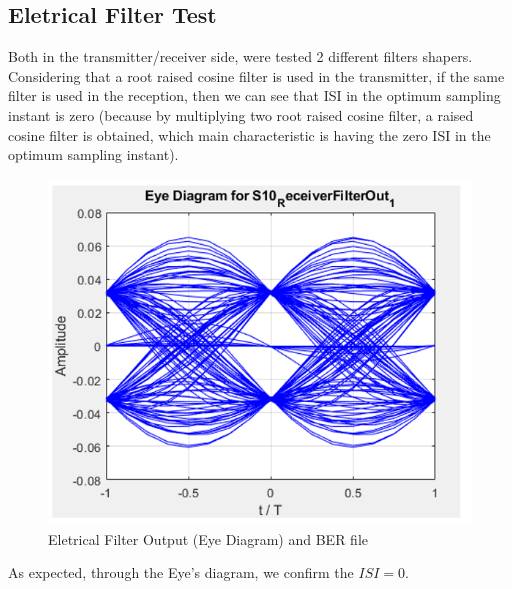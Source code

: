 \subsection*{Eletrical Filter Test}
Both in the transmitter/receiver side, were tested 2 different filters shapers.
Considering that a root raised cosine filter is used in the transmitter, if the same filter is used in the reception, then we can see that ISI in the optimum sampling instant is zero (because by multiplying two root raised cosine filter, a raised cosine filter is obtained, which main characteristic is having the zero ISI in the optimum sampling instant).
 \begin{figure}[H]
	\centering
	\includegraphics[scale=0.75]{./lib/m_qam_receiver/figures/rootroot}
	\caption{Eletrical Filter Output (Eye Diagram) and BER file }\label{root}
\end{figure}

As expected, through the Eye's diagram, we confirm the $ISI=0$. \\

